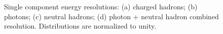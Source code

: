 \documentclass{cmspaper}
\begin{document}
\begin{figure}[tb]
\centering
{}
\caption{Single component energy resolutions: (a) charged hadrons; (b) photons; (c) neutral hadrons; (d) photon + neutral hadron combined resolution. Distributions are normalized to unity.\label{fig:Ex_resolutions}}
\end{figure}
\end{document}
